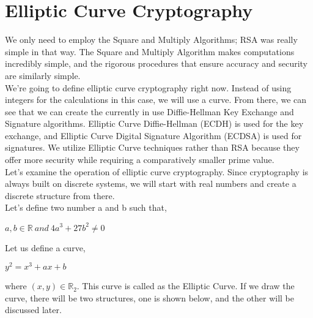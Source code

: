 \documentclass[11pt]{article}
\begin{document}
\section{Elliptic Curve Cryptography}
We only need to employ the Square and Multiply Algorithms; RSA was really simple in that way. The Square and Multiply Algorithm makes computations incredibly simple, and the rigorous procedures that ensure accuracy and security are similarly simple.\\
\newline
We're going to define elliptic curve cryptography right now. Instead of using integers for the calculations in this case, we will use a curve. From there, we can see that we can create the currently in use Diffie-Hellman Key Exchange and Signature algorithms. Elliptic Curve Diffie-Hellman (ECDH) is used for the key exchange, and Elliptic Curve Digital Signature Algorithm (ECDSA) is used for signatures. We utilize Elliptic Curve techniques rather than RSA because they offer more security while requiring a comparatively smaller prime value.\\
\newline
Let's examine the operation of elliptic curve cryptography. Since cryptography is always built on discrete systems, we will start with real numbers and create a discrete structure from there.\\
\newline
Let's define two number a and b such that,
\begin{center}
    $a, b \in \mathbb{R} \ and \ 4a^3 + 27b^2 \neq 0$
\end{center}
Let us define a curve,
\begin{center}
    $y^2 = x^3 + ax + b$
\end{center}
where $(x,y) \in \mathbb{R}_2$. This curve is called as the Elliptic Curve. If we draw the curve, there will be two structures, one is shown below, and the other will be discussed later.
\end{document}
